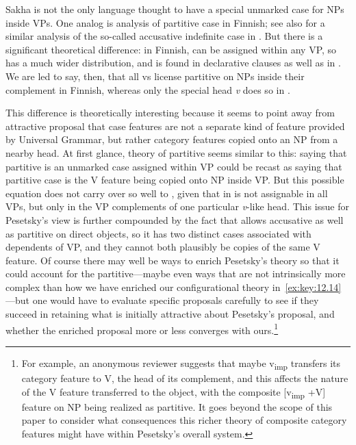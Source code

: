 \documentclass[output=paper]{langsci/langscibook}
\begin{document}
    \z
\z
Sakha is not the only language thought to have a special unmarked case for NPs
inside VPs. One analog is  analysis of partitive
case in Finnish; see also \citet{Baker2017} for a similar analysis of the
so-called accusative indefinite case in . But there is a significant
theoretical difference: in Finnish,  can be assigned within any
VP, so  has a much wider distribution, and is found in
declarative clauses as well as in . We are led to say, then, that
all vs license partitive on NPs inside their complement in Finnish, whereas
only the special head \emph{v}\textsubscript{\Imp} does so in .

This difference is theoretically interesting because it seems to point away
from  attractive proposal that case features are not a
separate kind of feature provided by Universal Grammar, but rather category
features copied onto an NP from a nearby head. At first glance,
 theory of partitive seems similar to this: saying that
partitive is an unmarked case assigned within VP could be recast as saying that
partitive case is the V feature being copied onto NP inside VP. But this
possible equation does not carry over so well to , given that in
  is not assignable in all VPs, but only in the VP
complements of one particular \emph{v}-like head. This issue for Pesetsky’s view is
further compounded by the fact that  allows accusative as well as
partitive on direct objects, so it has two distinct cases associated with
dependents of VP, and they cannot both plausibly be copies of the same V
feature.  Of course there may well be ways to enrich Pesetsky’s theory so that
it could account for the  partitive—maybe even ways that are not
intrinsically more complex than how we have enriched our configurational theory
in~\eqref{ex:key:12.14}—but one would have to evaluate specific proposals
carefully to see if they succeed in retaining what is initially attractive
about Pesetsky's proposal, and whether the enriched proposal more or less
converges with ours.\footnote{For example, an anonymous reviewer suggests that
    maybe v\textsubscript{imp} transfers its category feature to V, the head of
    its complement, and this affects the nature of the V feature transferred to
    the object, with the composite [v\textsubscript{imp} +V] feature on NP
    being realized as partitive.  It goes beyond the scope of this paper to
    consider what consequences this richer theory of composite category
features might have within Pesetsky’s overall system.}
\end{document}
